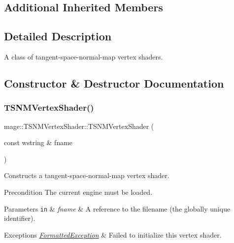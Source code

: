 \subsection*{Additional Inherited Members}


\subsection{Detailed Description}
A class of tangent-\/space-\/normal-\/map vertex shaders. 

\subsection{Constructor \& Destructor Documentation}
\hypertarget{classmage_1_1_t_s_n_m_vertex_shader_a4cba7b2ef6a6d972560db25ccae7cf37}{}\label{classmage_1_1_t_s_n_m_vertex_shader_a4cba7b2ef6a6d972560db25ccae7cf37} 
\subsubsection{\texorpdfstring{T\+S\+N\+M\+Vertex\+Shader()}{TSNMVertexShader()}\hspace{0.1cm}{\footnotesize\ttfamily [1/6]}}
{\footnotesize\ttfamily mage\+::\+T\+S\+N\+M\+Vertex\+Shader\+::\+T\+S\+N\+M\+Vertex\+Shader (\begin{DoxyParamCaption}\item[{const wstring \&}]{fname }\end{DoxyParamCaption})\hspace{0.3cm}{\ttfamily [explicit]}}

Constructs a tangent-\/space-\/normal-\/map vertex shader.

\begin{DoxyPrecond}{Precondition}
The current engine must be loaded. 
\end{DoxyPrecond}

\begin{DoxyParams}[1]{Parameters}
\mbox{\tt in}  & {\em fname} & A reference to the filename (the globally unique identifier). \\
\hline
\end{DoxyParams}

\begin{DoxyExceptions}{Exceptions}
{\em \hyperlink{structmage_1_1_formatted_exception}{Formatted\+Exception}} & Failed to initialize this vertex shader. \\
\hline
\end{DoxyExceptions}
\hypertarget{classmage_1_1_t_s_n_m_vertex_shader_a1fbd5a9033cec8fda17c2dee775cbe21}{}\label{classmage_1_1_t_s_n_m_vertex_shader_a1fbd5a9033cec8fda17c2dee775cbe21} 
